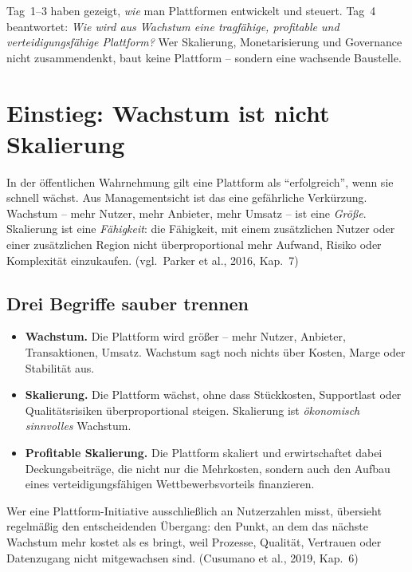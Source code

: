 \documentclass[11pt,a4paper,oneside]{article}
\newcommand{\fachbegriff}[1]{\textbf{#1}}
\newcommand{\quelle}[1]{{\footnotesize\color{lpGray}(#1)}}
\begin{document}
\begin{merkbox}
Tag~1--3 haben gezeigt, \emph{wie} man Plattformen entwickelt und steuert. Tag~4 beantwortet: \emph{Wie wird aus Wachstum eine tragfähige, profitable und verteidigungsfähige Plattform?} Wer Skalierung, Monetarisierung und Governance nicht zusammendenkt, baut keine Plattform -- sondern eine wachsende Baustelle.
\end{merkbox}

\clearpage

\section{Einstieg: Wachstum ist nicht Skalierung}

In der öffentlichen Wahrnehmung gilt eine Plattform als ``erfolgreich'', wenn sie schnell wächst. Aus Managementsicht ist das eine gefährliche Verkürzung. Wachstum -- mehr Nutzer, mehr Anbieter, mehr Umsatz -- ist eine \emph{Größe}. Skalierung ist eine \emph{Fähigkeit}: die Fähigkeit, mit einem zusätzlichen Nutzer oder einer zusätzlichen Region nicht überproportional mehr Aufwand, Risiko oder Komplexität einzukaufen. \quelle{vgl.\ Parker et al., 2016, Kap.~7}

\subsection{Drei Begriffe sauber trennen}

\begin{itemize}
  \item \fachbegriff{Wachstum.} Die Plattform wird größer -- mehr Nutzer, Anbieter, Transaktionen, Umsatz. Wachstum sagt noch nichts über Kosten, Marge oder Stabilität aus.
  \item \fachbegriff{Skalierung.} Die Plattform wächst, ohne dass Stückkosten, Supportlast oder Qualitätsrisiken überproportional steigen. Skalierung ist \emph{ökonomisch sinnvolles} Wachstum.
  \item \fachbegriff{Profitable Skalierung.} Die Plattform skaliert und erwirtschaftet dabei Deckungsbeiträge, die nicht nur die Mehrkosten, sondern auch den Aufbau eines verteidigungsfähigen Wettbewerbsvorteils finanzieren.
\end{itemize}

Wer eine Plattform-Initiative ausschließlich an Nutzerzahlen misst, übersieht regelmäßig den entscheidenden Übergang: den Punkt, an dem das nächste Wachstum mehr kostet als es bringt, weil Prozesse, Qualität, Vertrauen oder Datenzugang nicht mitgewachsen sind. \quelle{Cusumano et al., 2019, Kap.~6}
\end{document}
